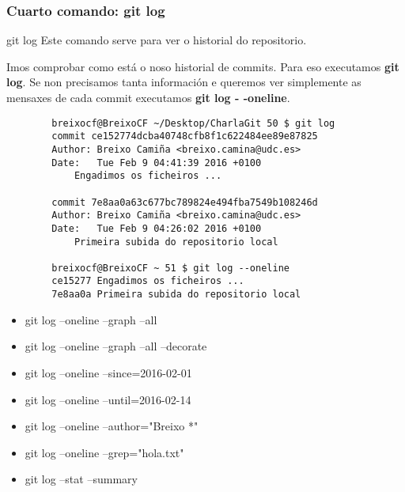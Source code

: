 \begin{frame}[fragile]
  \frametitle{Cuarto comando: git log}
  \begin{block}{git log}
    Este comando serve para ver o historial do repositorio.
  \end{block}
  \scriptsize
  Imos comprobar como está o noso historial de commits. Para eso executamos \textbf{git log}. Se non precisamos tanta información e queremos ver simplemente as mensaxes de cada commit executamos \textbf{git log - -oneline}.
  \tiny 
  
  \begin{multicols}{2}
\begin{verbatim}
		breixocf@BreixoCF ~/Desktop/CharlaGit 50 $ git log
		commit ce152774dcba40748cfb8f1c622484ee89e87825
		Author: Breixo Camiña <breixo.camina@udc.es>
		Date:   Tue Feb 9 04:41:39 2016 +0100
		    Engadimos os ficheiros ...
		
		commit 7e8aa0a63c677bc789824e494fba7549b108246d
		Author: Breixo Camiña <breixo.camina@udc.es>
		Date:   Tue Feb 9 04:26:02 2016 +0100
		    Primeira subida do repositorio local
		    
		breixocf@BreixoCF ~ 51 $ git log --oneline
		ce15277 Engadimos os ficheiros ...
		7e8aa0a Primeira subida do repositorio local
\end{verbatim}
    \columnbreak
    \tiny 
    \begin{itemize}
    \item git log --oneline --graph --all
    \item git log --oneline --graph --all --decorate
    \item git log --oneline --since=2016-02-01
    \item git log --oneline --until=2016-02-14
    \item git log --oneline --author="Breixo *"
    \item git log --oneline --grep="hola.txt"
    \item git log --stat --summary
    \end{itemize}
  \end{multicols}
  
\end{frame}

